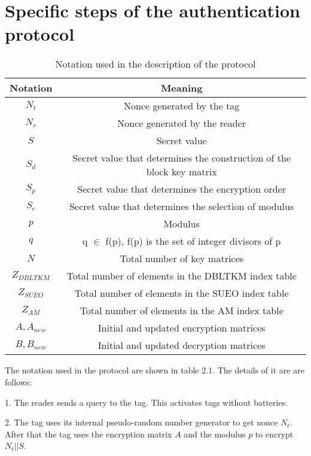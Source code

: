 \section{Specific steps of the authentication protocol}

\begin{table}[H]
    \centering
    \caption{Notation used in the description of the protocol}
    \begin{tabular}{| c | c |}
        \hline
        Notation & Meaning \\
        \hline
        $N_t$ & Nonce generated by the tag \\
        $N_r$ & Nonce generated by the reader \\
        $S$ & Secret value \\
        $S_d$ & Secret value that determines the construction of the block key matrix  \\
        $S_p$ & Secret value that determines the encryption order  \\
        $S_c$ & Secret value that determines the selection of modulus  \\
        $p$ & Modulus  \\
        $q$ & q $\in$ f(p), f(p) is the set of integer divisors of p \\
        $N$ &  Total number of key matrices \\
        $Z_{DBLTKM}$ &  Total number of elements in the DBLTKM index table \\
        $Z_{SUEO}$ & Total number of elements in the SUEO index table  \\
        $Z_{AM}$ & Total number of elements in the AM index table  \\
        $A, A_{new}$ & Initial and updated encryption matrices \\
        $B, B_{new}$ & Initial and updated decryption matrices \\
        \hline
    \end{tabular}
\end{table}

    The notation used in the protocol are shown in table 2.1. The details of it are are follows:

    1. The reader sends a query to the tag. This activates tags without batteries.

    2. The tag uses its internal pseudo-random number generator to get nonce $N_t$. After that the tag uses the encryption matrix $A$ and the modulus $p$ to 
    encrypt $N_t||S$.

